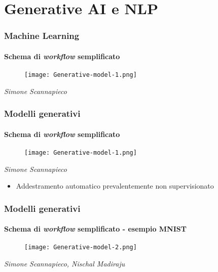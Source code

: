 \section{Generative AI e NLP}
\label{sec:genai_nlp}
%
\begin{frame}[t] \frametitle{Machine Learning}
\framesubtitle{Schema di \emph{workflow} semplificato}
	\begin{minipage}[t]{\textwidth}
		\vspace{-.7cm}
		\begin{figure}
			\centering
			\texttt{[image: Generative-model-1.png]}
		\end{figure}
        \begin{flushright}
            \vspace*{-10pt}
            {\tiny\textit{\textcopyright Simone Scannapieco}}
        \end{flushright}
	\end{minipage}
\end{frame}
%
\begin{frame}[t] \frametitle{Modelli generativi}
\framesubtitle{Schema di \emph{workflow} semplificato}
	\begin{minipage}[t]{\textwidth}
		\vspace{-.7cm}
		\begin{figure}
			\centering
			\texttt{[image: Generative-model-1.png]}
		\end{figure}
        \begin{flushright}
            \vspace*{-10pt}
            {\tiny\textit{\textcopyright Simone Scannapieco}}
        \end{flushright}
		\vspace{-.3cm}
		\begin{itemize}[leftmargin=10pt,align=right]
			\item[\alert{\faArrowCircleRight}] Addestramento automatico prevalentemente \alert{non supervisionato}
		\end{itemize}
	\end{minipage}
\end{frame}
%
\begin{frame}[t] \frametitle{Modelli generativi}
\framesubtitle{Schema di \emph{workflow} semplificato - esempio MNIST}
{\footnotesize
	\begin{minipage}[t]{\textwidth}
		\vspace{-.7cm}
		\begin{figure}
			\centering
			\texttt{[image: Generative-model-2.png]}
		\end{figure}
		\begin{flushright}
			 \vspace*{-10pt}
            {\tiny\textit{\textcopyright Simone Scannapieco, Nischal Madiraju}}
		\end{flushright}
	\end{minipage}
}
\end{frame}
